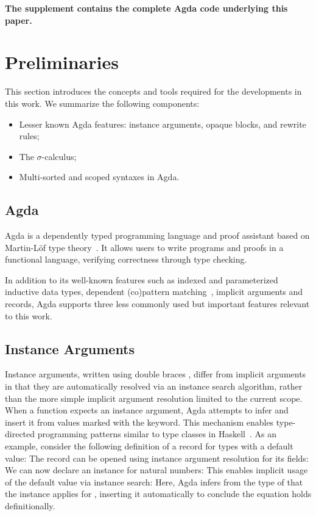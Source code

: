 \documentclass[screen,nonacm]{acmart}
\begin{document}
\noindent\textbf{The supplement contains the complete Agda code underlying this paper.}

\section{Preliminaries}\label{sec:pre}
This section introduces the concepts and tools required for the developments in
this work. We summarize the following components:
\begin{itemize}
      \item Lesser known Agda features: instance arguments, opaque blocks, and rewrite
            rules;
      \item The $\sigma$-calculus;
      \item Multi-sorted and scoped syntaxes in Agda.
\end{itemize}

\subsection{Agda}\label{sec:pre-agd} Agda is a dependently typed programming language and proof assistant based on
Martin-Löf type theory~\cite{MARTINLOF197573}. It allows users to write
programs and proofs in a functional language, verifying correctness through
type checking.

In addition to its well-known features such as indexed and parameterized
inductive data types, dependent (co)pattern matching~\cite{10.1145/3236770},
implicit arguments and records, Agda supports three less commonly used but
important features relevant to this work.

\subsection*{Instance Arguments}

Instance arguments, written using double braces \AgdaSymbol{\{\{\dots\}\}},
differ from implicit arguments \AgdaSymbol{\{\dots\}} in that they are
automatically resolved via an instance search algorithm, rather than the more
simple implicit argument resolution limited to the current scope. When a
function expects an instance argument, Agda attempts to infer and insert it
from values marked with the  keyword. This mechanism
enables type-directed programming patterns similar to type classes in
Haskell~\cite{10.1145/75277.75283}. As an example, consider the following
definition of a record for types with a default value: \EDefault{}The record
can be opened using instance argument resolution for its fields:
\EDefFields{}We can now declare an instance for natural numbers:
\EDefInst{}This enables implicit usage of the default value via instance
search: \EDefEx{} Here, Agda infers from the type  of
 that the instance  applies for
, inserting it automatically to conclude the equation
holds definitionally.
\end{document}
